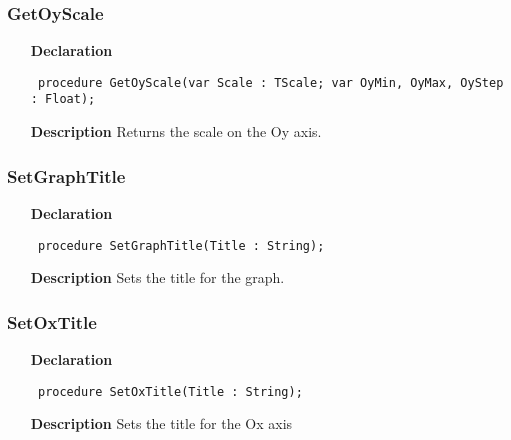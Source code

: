 \documentclass[12pt,a4paper,oneside]{report}
\newcommand{\declarationitem}[1]{\textbf{#1}}
\newcommand{\descriptiontitle}[1]{\textbf{#1}}
\newcommand{\code}[1]{\texttt{#1}}
\begin{document}
\subsubsection{GetOyScale}
\label{uplot-GetOyScale}
\begin{itemize}\item[\declarationitem{Declaration}\hfill]
	\begin{flushleft}
		\code{
			procedure GetOyScale(var Scale : TScale; var OyMin, OyMax, OyStep : Float);}
		
	\end{flushleft}
	
	\par
	\item[\descriptiontitle{Description}]
	Returns the scale on the Oy axis.
	
\end{itemize}
\subsubsection{SetGraphTitle}
\label{uplot-SetGraphTitle}
\begin{itemize}\item[\declarationitem{Declaration}\hfill]
	\begin{flushleft}
		\code{
			procedure SetGraphTitle(Title : String);}
		
	\end{flushleft}
	
	\par
	\item[\descriptiontitle{Description}]
	Sets the title for the graph.
	
\end{itemize}
\subsubsection{SetOxTitle}
\label{uplot-SetOxTitle}
\begin{itemize}\item[\declarationitem{Declaration}\hfill]
	\begin{flushleft}
		\code{
			procedure SetOxTitle(Title : String);}
		
	\end{flushleft}
	
	\par
	\item[\descriptiontitle{Description}]
	Sets the title for the Ox axis
	
\end{itemize}
\end{document}
